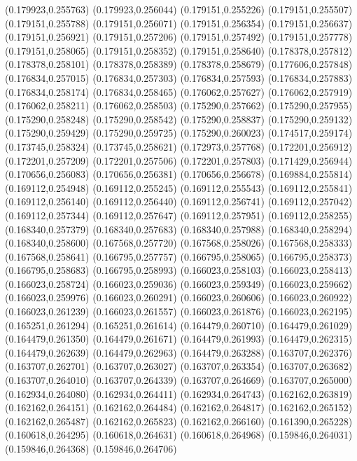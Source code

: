 (0.179923,0.255763)
(0.179923,0.256044)
(0.179151,0.255226)
(0.179151,0.255507)
(0.179151,0.255788)
(0.179151,0.256071)
(0.179151,0.256354)
(0.179151,0.256637)
(0.179151,0.256921)
(0.179151,0.257206)
(0.179151,0.257492)
(0.179151,0.257778)
(0.179151,0.258065)
(0.179151,0.258352)
(0.179151,0.258640)
(0.178378,0.257812)
(0.178378,0.258101)
(0.178378,0.258389)
(0.178378,0.258679)
(0.177606,0.257848)
(0.176834,0.257015)
(0.176834,0.257303)
(0.176834,0.257593)
(0.176834,0.257883)
(0.176834,0.258174)
(0.176834,0.258465)
(0.176062,0.257627)
(0.176062,0.257919)
(0.176062,0.258211)
(0.176062,0.258503)
(0.175290,0.257662)
(0.175290,0.257955)
(0.175290,0.258248)
(0.175290,0.258542)
(0.175290,0.258837)
(0.175290,0.259132)
(0.175290,0.259429)
(0.175290,0.259725)
(0.175290,0.260023)
(0.174517,0.259174)
(0.173745,0.258324)
(0.173745,0.258621)
(0.172973,0.257768)
(0.172201,0.256912)
(0.172201,0.257209)
(0.172201,0.257506)
(0.172201,0.257803)
(0.171429,0.256944)
(0.170656,0.256083)
(0.170656,0.256381)
(0.170656,0.256678)
(0.169884,0.255814)
(0.169112,0.254948)
(0.169112,0.255245)
(0.169112,0.255543)
(0.169112,0.255841)
(0.169112,0.256140)
(0.169112,0.256440)
(0.169112,0.256741)
(0.169112,0.257042)
(0.169112,0.257344)
(0.169112,0.257647)
(0.169112,0.257951)
(0.169112,0.258255)
(0.168340,0.257379)
(0.168340,0.257683)
(0.168340,0.257988)
(0.168340,0.258294)
(0.168340,0.258600)
(0.167568,0.257720)
(0.167568,0.258026)
(0.167568,0.258333)
(0.167568,0.258641)
(0.166795,0.257757)
(0.166795,0.258065)
(0.166795,0.258373)
(0.166795,0.258683)
(0.166795,0.258993)
(0.166023,0.258103)
(0.166023,0.258413)
(0.166023,0.258724)
(0.166023,0.259036)
(0.166023,0.259349)
(0.166023,0.259662)
(0.166023,0.259976)
(0.166023,0.260291)
(0.166023,0.260606)
(0.166023,0.260922)
(0.166023,0.261239)
(0.166023,0.261557)
(0.166023,0.261876)
(0.166023,0.262195)
(0.165251,0.261294)
(0.165251,0.261614)
(0.164479,0.260710)
(0.164479,0.261029)
(0.164479,0.261350)
(0.164479,0.261671)
(0.164479,0.261993)
(0.164479,0.262315)
(0.164479,0.262639)
(0.164479,0.262963)
(0.164479,0.263288)
(0.163707,0.262376)
(0.163707,0.262701)
(0.163707,0.263027)
(0.163707,0.263354)
(0.163707,0.263682)
(0.163707,0.264010)
(0.163707,0.264339)
(0.163707,0.264669)
(0.163707,0.265000)
(0.162934,0.264080)
(0.162934,0.264411)
(0.162934,0.264743)
(0.162162,0.263819)
(0.162162,0.264151)
(0.162162,0.264484)
(0.162162,0.264817)
(0.162162,0.265152)
(0.162162,0.265487)
(0.162162,0.265823)
(0.162162,0.266160)
(0.161390,0.265228)
(0.160618,0.264295)
(0.160618,0.264631)
(0.160618,0.264968)
(0.159846,0.264031)
(0.159846,0.264368)
(0.159846,0.264706)
